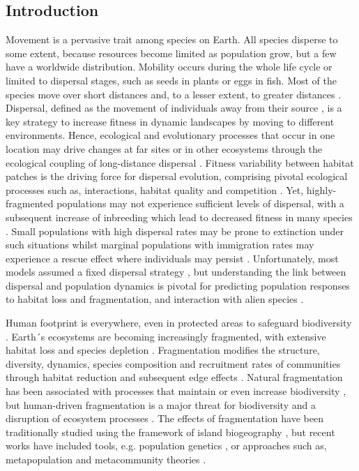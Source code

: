 \documentclass[12pt]{article}
\begin{document}
\begin{justify}
{{{{{\section{Introduction}
Movement is a pervasive trait among species on Earth. All species disperse to some extent, because resources become limited as population grow, but a few have a worldwide distribution. Mobility occurs during the whole life cycle or limited to dispersal stages, such as seeds in plants or eggs in fish. Most of the species move over short distances and, to a lesser extent, to greater distances \citep{davidson2004quantifying}. Dispersal, defined as the movement of individuals away from their source \citep{nathan2003methods}, is a key strategy to increase fitness in dynamic landscapes by moving to different environments. Hence, ecological and evolutionary processes that occur in one location may drive changes at far sites or in other ecosystems through the ecological coupling of long-distance dispersal \citep{gaines2007connecting}. Fitness variability between habitat patches is the driving force for dispersal evolution, comprising pivotal ecological processes such as, interactions, habitat quality and competition \citep{bowler2005causes}. Yet, highly-fragmented populations may not experience sufficient levels of dispersal, with a subsequent increase of inbreeding which lead to decreased fitness in many species \citep{fath2018encyclopedia}. Small populations with high dispersal rates may be prone to extinction under such situations whilst marginal populations with immigration rates may experience a rescue effect where individuals may persist \citep{eriksson2014emergence}. Unfortunately, most models assumed a fixed dispersal strategy \citep{mccallum2001should, levin2003ecology}, but understanding the link between dispersal and population dynamics is pivotal for predicting population responses to habitat loss and fragmentation, and interaction with alien species \citep{bowler2005causes}.

Human footprint is everywhere, even in protected areas to safeguard biodiversity \citep{ tournadre2014anthropogenic, jones2018one}. Earth´s ecosystems are becoming increasingly fragmented, with extensive habitat loss and species depletion \citep{haddad2015habitat}. Fragmentation modifies the structure, diversity, dynamics, species composition and recruitment rates of communities through habitat reduction and subsequent edge effects \citep{laurance1998effects, short2011extinction}. Natural fragmentation has been associated with processes that maintain or even increase biodiversity \citep{tilman1988plant}, but human-driven fragmentation is a major threat for biodiversity \citep{pimm2000biodiversity} and a disruption of ecosystem processes \citep{achard2002determination}. The effects of fragmentation have been traditionally studied using the framework of island biogeography \citep{whittaker2007island}, but recent works have included tools, e.g. population genetics \citep{young1996population}, or approaches such as, metapopulation \citep{hanski2004ecology} and metacommunity theories \citep{mouquet2011extinction}.

}}}}}
\end{justify}
\end{document}
